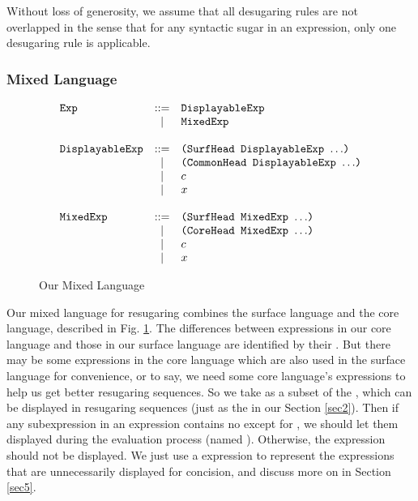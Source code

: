 
Without loss of generosity, we assume that all desugaring rules are not overlapped in the sense that for any syntactic sugar in an expression, only one desugaring rule is applicable.


\subsubsection{Mixed Language}
\begin{figure}[t]
\begin{centering}
{\footnotesize
\[
			\begin{array}{lcl}
			\mbox{\tt Exp} &::=& \mbox{\tt DisplayableExp}\\
			&|& \mbox{\tt MixedExp}\\
			\\
			\mbox{\tt DisplayableExp} &::=& \mbox{\tt (SurfHead~DisplayableExp~$\ldots$)}\\
			&|& \mbox{\tt (CommonHead~DisplayableExp~$\ldots$)}\\
			&|& c\\
			&|& x\\
			\\
			\mbox{\tt MixedExp} &::=& \mbox{\tt (SurfHead~MixedExp~$\ldots$)}\\
			&|& \mbox{\tt (CoreHead~MixedExp~$\ldots$)}\\
			&|& c\\
			&|& x\\
			\end{array}
			\]
}

\end{centering}
\caption{Our Mixed Language}
\label{fig:mix}
\end{figure}

Our mixed language for resugaring combines the surface language and the core language, described in Fig.  \ref{fig:mix}.
%
The differences between expressions in our core language and those in our surface language are identified by their . But there may be some expressions in the core language which are also used in the surface language for convenience, or to say, we need some core language's expressions to help us get better resugaring sequences. So we take  as a subset of the , which can be displayed in resugaring sequences (just as the  in our Section \ref{sec2}). Then if any subexpression in an expression contains no  except for , we should let them displayed during the evaluation process (named ). Otherwise, the expression should not be displayed. We just use a  expression to represent the expressions that are unnecessarily displayed for concision, and discuss more on   in Section \ref{sec5}.


